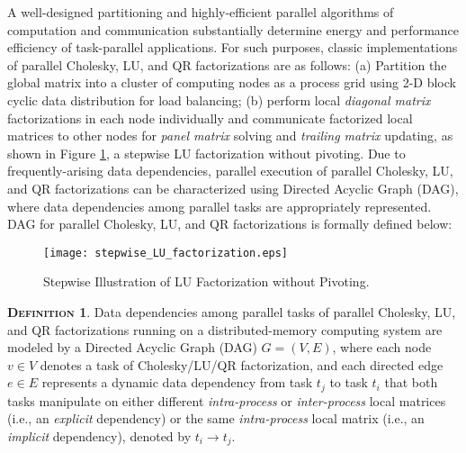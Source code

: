 \documentclass[12pt]{elsarticle}
\begin{document}
A well-designed partitioning and highly-efficient parallel algorithms of computation and communication substantially determine energy and performance efficiency of task-parallel applications. For such purposes, classic implementations of parallel Cholesky, LU, and QR factorizations are as follows: (a) Partition the global matrix into a cluster of computing nodes as a process grid using 2-D block cyclic data distribution \cite{ics11} for load balancing; (b) perform local \emph{diagonal matrix} factorizations in each node individually and communicate factorized local matrices to other nodes for \emph{panel matrix} solving and \emph{trailing matrix} updating, as shown in Figure \ref{stepwise_LU_factorization}, a stepwise LU factorization without pivoting. Due to frequently-arising data dependencies, parallel execution of parallel Cholesky, LU, and QR factorizations can be characterized using Directed Acyclic Graph (DAG), where data dependencies among parallel tasks are appropriately represented. DAG for parallel Cholesky, LU, and QR factorizations is formally defined below:

\begin{figure}[h]
\centering
\texttt{[image: stepwise\_LU\_factorization.eps]}\\
\caption{Stepwise Illustration of LU Factorization without Pivoting.}
\label{stepwise_LU_factorization}
\end{figure}

\vspace{1mm}
\noindent\textsc{\textbf{Definition 1}}. Data dependencies among parallel tasks of parallel Cholesky, LU, and QR factorizations running on a distributed-memory computing system are modeled by a Directed Acyclic Graph (DAG) $G=(V,E)$, where each node $v \in V$ denotes a task of Cholesky/LU/QR factorization, and each directed edge $e \in E$ represents a dynamic data dependency from task $t_j$ to task $t_i$ that both tasks manipulate on either different \emph{intra-process} or \emph{inter-process} local matrices (i.e., an \emph{explicit} dependency) or the same \emph{intra-process} local matrix (i.e., an \emph{implicit} dependency), denoted by $t_i \rightarrow t_j$.
\end{document}
